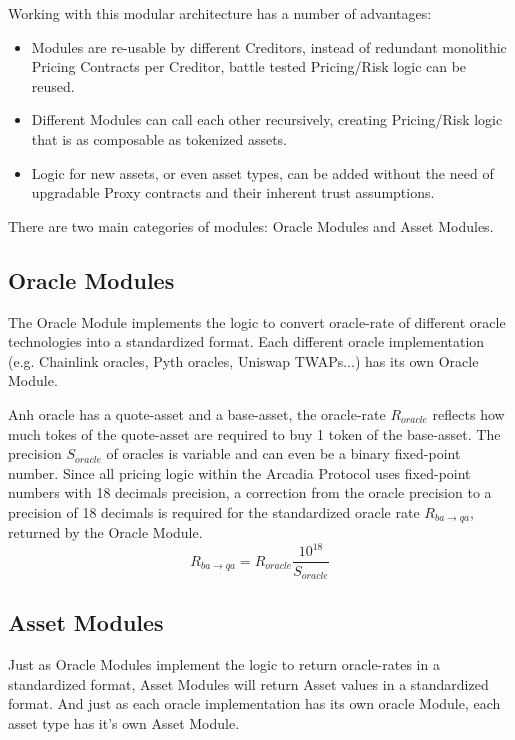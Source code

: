 \documentclass[sigconf,nonacm]{acmart}
\begin{document}
Working with this modular architecture has a number of advantages:
\begin{itemize}
    \item Modules are re-usable by different Creditors, instead of redundant monolithic Pricing Contracts per Creditor, battle tested Pricing/Risk logic can be reused.
    \item Different Modules can call each other recursively, creating Pricing/Risk logic that is as composable as tokenized assets.
    \item Logic for new assets, or even asset types, can be added without the need of upgradable Proxy contracts and their inherent trust assumptions.
\end{itemize}

There are two main categories of modules: Oracle Modules and Asset Modules.

\subsection{Oracle Modules}
The Oracle Module implements the logic to convert oracle-rate of different oracle technologies into a standardized format.
Each different oracle implementation (e.g. Chainlink oracles, Pyth oracles, Uniswap TWAPs...) has its own Oracle Module.

Anh oracle has a quote-asset and a base-asset, the oracle-rate $R_{oracle}$ reflects how much tokes of the quote-asset are required to buy 1 token of the base-asset.
The precision $S_{oracle}$ of oracles is variable and can even be a binary fixed-point number.
Since all pricing logic within the Arcadia Protocol uses fixed-point numbers with 18 decimals precision,
a correction from the oracle precision to a precision of 18 decimals is required for the standardized oracle rate $R_{ba\rightarrow qa}$, returned by the Oracle Module.
\begin{equation}
    \label{eq:oracle-module}
    R_{ba\rightarrow qa} = R_{oracle} \frac{10^{18}}{S_{oracle}}
\end{equation}

\subsection{Asset Modules}
Just as Oracle Modules implement the logic to return oracle-rates in a standardized format, Asset Modules will return Asset values in a standardized format.
And just as each oracle implementation has its own oracle Module, each asset type has it's own Asset Module.
\end{document}

